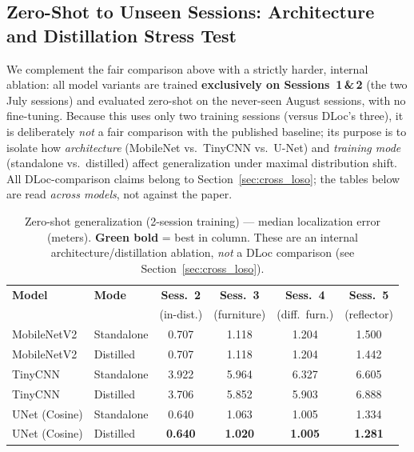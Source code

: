 \documentclass[11pt,a4paper]{article}
\newcommand{\best}[1]{\textcolor{bestcolor}{\textbf{#1}}}
\begin{document}
\subsection{Zero-Shot to Unseen Sessions: Architecture and Distillation Stress Test}
\label{sec:cross_zeroshot}

We complement the fair comparison above with a strictly harder, internal ablation: all model variants are trained \textbf{exclusively on Sessions~1\,\&\,2} (the two July sessions) and evaluated zero-shot on the never-seen August sessions, with no fine-tuning.
Because this uses only two training sessions (versus DLoc's three), it is deliberately \emph{not} a fair comparison with the published baseline; its purpose is to isolate how \emph{architecture} (MobileNet vs.\ TinyCNN vs.\ U-Net) and \emph{training mode} (standalone vs.\ distilled) affect generalization under maximal distribution shift.
All DLoc-comparison claims belong to Section~\ref{sec:cross_loso}; the tables below are read \emph{across models}, not against the paper.

\begin{table}[H]
\centering
\caption{Zero-shot generalization (2-session training) --- median localization error (meters). \best{Green bold} = best in column. These are an internal architecture/distillation ablation, \emph{not} a DLoc comparison (see Section~\ref{sec:cross_loso}).}
\label{tab:cross_session_median}
\begin{tabular}{@{}llcccc@{}}
\toprule
\textbf{Model} & \textbf{Mode} & \textbf{Sess.~2} & \textbf{Sess.~3} & \textbf{Sess.~4} & \textbf{Sess.~5} \\
 &  & \footnotesize{(in-dist.)} & \footnotesize{(furniture)} & \footnotesize{(diff.\ furn.)} & \footnotesize{(reflector)} \\
\midrule
MobileNetV2   & Standalone & 0.707 & 1.118 & 1.204 & 1.500 \\
MobileNetV2   & Distilled  & 0.707 & 1.118 & 1.204 & 1.442 \\
\midrule
TinyCNN       & Standalone & 3.922 & 5.964 & 6.327 & 6.605 \\
TinyCNN       & Distilled  & 3.706 & 5.852 & 5.903 & 6.888 \\
\midrule
UNet (Cosine) & Standalone & 0.640 & 1.063 & 1.005 & 1.334 \\
UNet (Cosine) & Distilled  & \best{0.640} & \best{1.020} & \best{1.005} & \best{1.281} \\
\bottomrule
\end{tabular}
\end{table}
\end{document}
